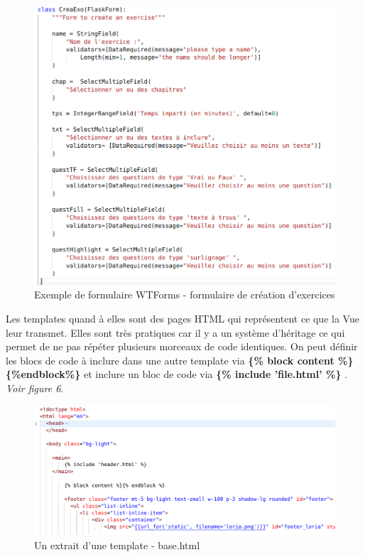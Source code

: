 \documentclass[12pt]{article}
\begin{document}
\begin{figure}[h]
    \centering
    \includegraphics[scale=0.3]{ex_wtforms.png}
    \caption{Exemple de formulaire WTForms - formulaire de création d'exercices}
    \label{fig:ex_wtforms}
\end{figure}

\clearpage

Les templates quand à elles sont des pages HTML qui représentent ce que la Vue leur transmet. Elles sont très pratiques car il y a un système d'héritage ce qui permet de ne pas répéter plusieurs morceaux de code identiques. On peut définir les blocs de code à inclure dans une autre template via \textbf{ \{\% block content \%\} \{\%endblock\%\}} et inclure un bloc de code via \textbf{ \{\% include 'file.html' \%\} }. \textit{Voir figure 6}. 

\begin{figure}[h]
    \centering
    \includegraphics[scale=0.3]{ex_block_base.png}
    \caption{Un extrait d'une template - base.html}
    \label{fig:ex_temp}
\end{figure}
\end{document}
